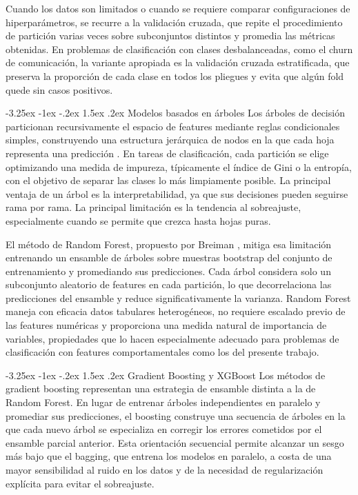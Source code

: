 \documentclass[11pt,a4paper]{article}
\makeatletter
\renewcommand\subsection{\@startsection{subsection}{2}{\z@}%
  {-3.25ex \@plus -1ex \@minus -.2ex}%
  {1.5ex \@plus .2ex}%
  {\normalfont\normalsize\itshape}}
\makeatother
\begin{document}
Cuando los datos son limitados o cuando se requiere comparar configuraciones de hiperparámetros, se recurre a la validación cruzada, que repite el procedimiento de partición varias veces sobre subconjuntos distintos y promedia las métricas obtenidas. En problemas de clasificación con clases desbalanceadas, como el churn de comunicación, la variante apropiada es la validación cruzada estratificada, que preserva la proporción de cada clase en todos los pliegues y evita que algún fold quede sin casos positivos.
 
\subsection{Modelos basados en árboles}
Los árboles de decisión particionan recursivamente el espacio de features mediante reglas condicionales simples, construyendo una estructura jerárquica de nodos en la que cada hoja representa una predicción \cite{hastie2009elements}. En tareas de clasificación, cada partición se elige optimizando una medida de impureza, típicamente el índice de Gini o la entropía, con el objetivo de separar las clases lo más limpiamente posible. La principal ventaja de un árbol es la interpretabilidad, ya que sus decisiones pueden seguirse rama por rama. La principal limitación es la tendencia al sobreajuste, especialmente cuando se permite que crezca hasta hojas puras.
 
El método de Random Forest, propuesto por Breiman \cite{breiman2001random}, mitiga esa limitación entrenando un ensamble de árboles sobre muestras bootstrap del conjunto de entrenamiento y promediando sus predicciones. Cada árbol considera solo un subconjunto aleatorio de features en cada partición, lo que decorrelaciona las predicciones del ensamble y reduce significativamente la varianza. Random Forest maneja con eficacia datos tabulares heterogéneos, no requiere escalado previo de las features numéricas y proporciona una medida natural de importancia de variables, propiedades que lo hacen especialmente adecuado para problemas de clasificación con features comportamentales como los del presente trabajo.

\subsection{Gradient Boosting y XGBoost}
Los métodos de gradient boosting representan una estrategia de ensamble distinta a la de Random Forest. En lugar de entrenar árboles independientes en paralelo y promediar sus predicciones, el boosting construye una secuencia de árboles en la que cada nuevo árbol se especializa en corregir los errores cometidos por el ensamble parcial anterior. Esta orientación secuencial permite alcanzar un sesgo más bajo que el bagging, que entrena los modelos en paralelo, a costa de una mayor sensibilidad al ruido en los datos y de la necesidad de regularización explícita para evitar el sobreajuste.
\end{document}
